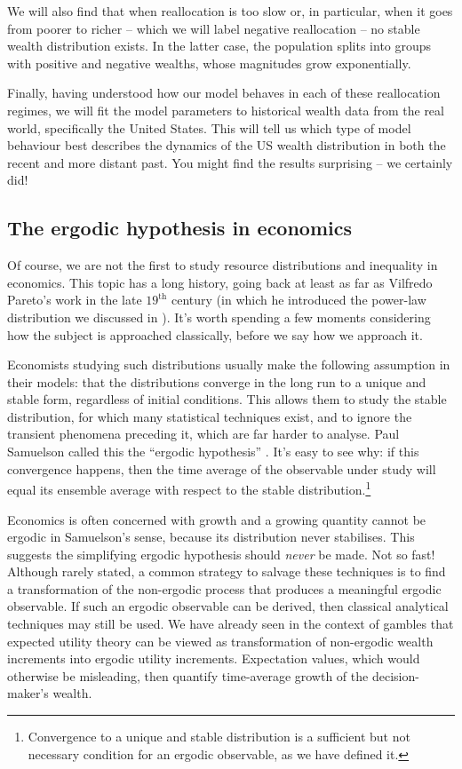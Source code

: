 We will also find that when reallocation is too slow or, in particular, when it goes from poorer to richer -- which we will label negative reallocation -- no stable wealth distribution exists. In the latter case, the population splits into groups with positive and negative wealths, whose magnitudes grow exponentially.

Finally, having understood how our model behaves in each of these reallocation regimes, we will fit the model parameters to historical wealth data from the real world, specifically the United States. This will tell us which type of model behaviour best describes the dynamics of the US wealth distribution in both the recent and more distant past. You might find the results surprising -- we certainly did!


\subsection{The ergodic hypothesis in economics}
Of course, we are not the first to study resource distributions and inequality in economics. This topic has a long history, going back at least as far as Vilfredo Pareto's work in the late $19^\text{th}$ century \cite{Pareto1897} (in which he introduced the power-law distribution we discussed in ). It's worth spending a few moments considering how the subject is approached classically, before we say how we approach it.

Economists studying such distributions usually make the following assumption in their models: that the distributions converge in the long run to a unique and stable form, regardless of initial conditions. This allows them to study the stable distribution, for which many statistical techniques exist, and to ignore the transient phenomena preceding it, which are far harder to analyse. Paul Samuelson called this the ``ergodic hypothesis'' \cite[pp.~11-12]{Samuelson1968}. It's easy to see why: if this convergence happens, then the time average of the observable under study will equal its ensemble average with respect to the stable distribution.\footnote{Convergence to a unique and stable distribution is a sufficient but not necessary condition for an ergodic observable, as we have defined it.}

Economics is often concerned with growth and a growing quantity cannot be ergodic in Samuelson's sense, because its distribution never stabilises. This suggests the simplifying ergodic hypothesis should \textit{never} be made. Not so fast! Although rarely stated, a common strategy to salvage these techniques is to find a transformation of the non-ergodic process that produces a meaningful ergodic observable. If such an ergodic observable can be derived, then classical analytical techniques may still be used. We have already seen in the context of gambles that expected utility theory can be viewed as transformation of non-ergodic wealth increments into ergodic utility increments. Expectation values, which would otherwise be misleading, then quantify time-average growth of the decision-maker's wealth.

